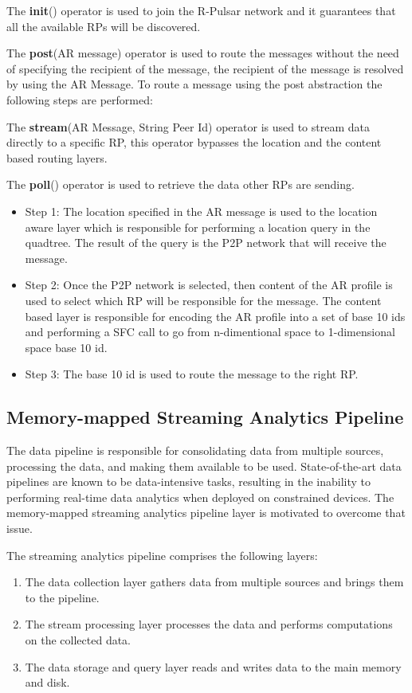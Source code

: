 The \textbf{init}() operator is used to join the R-Pulsar network and it guarantees that all the available RPs will be discovered.

The \textbf{post}(AR message) operator is used to route the messages without the need of specifying the recipient of the message, the recipient of the message is resolved by using the AR Message. To route a message using the post abstraction the following steps are performed:

The \textbf{stream}(AR Message, String Peer Id) operator is used to stream data directly to a specific RP, this operator bypasses the location and the content based routing layers.

The \textbf{poll}() operator is used to retrieve the data other RPs are sending.

\begin{itemize}
    \item Step 1: The location specified in the AR message is used to the location aware layer which is responsible for performing a location query in the quadtree. The result of the query is the P2P network that will receive the message.
    \item Step 2: Once the P2P network is selected, then content of the AR profile is used to select which RP will be responsible for the message. The content based layer is responsible for encoding the AR profile into a set of base 10 ids and performing a SFC call to go from n-dimentional space to 1-dimensional space base 10 id.
    \item Step 3: The base 10 id is used to route the message to the right RP.
\end{itemize}

\subsection{Memory-mapped Streaming Analytics Pipeline}
The data pipeline is responsible for consolidating data from multiple sources, processing the data, and making them available to be used. State-of-the-art data pipelines are known to be data-intensive tasks, resulting in the inability to performing real-time data analytics when deployed on constrained devices. The memory-mapped streaming analytics pipeline layer is motivated to overcome that issue.

The streaming analytics pipeline comprises the following layers: 

\begin{enumerate}

\item The data collection layer gathers data from multiple sources and brings them to the pipeline.
\item The stream processing layer processes the data and performs computations on the collected data.   
\item The data storage and query layer reads and writes data to the main memory and disk.

\end{enumerate}

